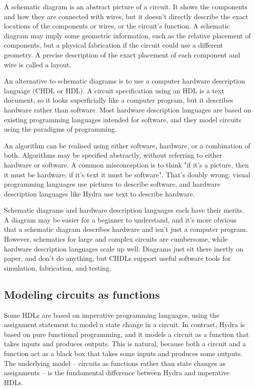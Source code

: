 \documentclass[]{svmono}
\begin{document}
A schematic diagram is an abstract picture of a circuit.  It shows
the components and how they are connected with wires, but it
doesn't directly describe the exact locations of the components or
wires, or the circuit's function.  A schematic diagram may imply
some geometric information, such as the relative placement of
components, but a physical fabrication if the circuit could use a
different geometry.  A precise description of the exact placement
of each component and wire is called a layout.

An alternative to schematic diagrams is to use a computer hardware
description language (CHDL or HDL).  A circuit specification using
an HDL is a text document, so it looks superficially like a
computer program, but it describes hardware rather than software.
Most hardware description languages are based on existing
programming languages intended for software, and they model
circuits using the paradigms of programming.

An algorithm can be realised using either software, hardware, or a
combination of both.  Algorithms may be specified abstractly,
without referring to either hardware or software.  A common
misconception is to think "if it's a picture, then it must be
hardware; if it's text it must be software".  That's doubly wrong:
visual programming languages use pictures to describe software,
and hardware description languages like Hydra use text to describe
hardware.

Schematic diagrams and hardware description languages each have
their merits.  A diagram may be easier for a beginner to
understand, and it's more obvious that a schematic diagram
describes hardware and isn't just a computer program.  However,
schematics for large and complex circuits are cumbersome, while
hardware description languages scale up well.  Diagrams just sit
there inertly on paper, and don't do anything, but CHDLs support
useful software tools for simulation, fabrication, and testing.
\subsection*{Modeling circuits as functions}
\label{sec:org5c56129}

Some HDLs are based on imperative programming languages, using the
assignment statement to model a state change in a circuit.  In
contrast, Hydra is based on pure functional programming, and it
models a circuit as a function that takes inputs and produces
outputs. This is natural, because both a circuit and a function
act as a black box that takes some inputs and produces some
outputs.  The underlying model -- circuits as functions rather
than state changes as assignments -- is the fundamental difference
between Hydra and imperative HDLs.
\end{document}
